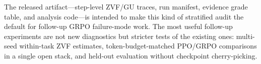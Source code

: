 The released artifact---step-level ZVF/GU traces, run manifest, evidence
grade table, and analysis code---is intended to make this kind of stratified
audit the default for follow-up GRPO failure-mode work. The most useful
follow-up experiments are not new diagnostics but stricter tests of the
existing ones: multi-seed within-task ZVF estimates, token-budget-matched
PPO/GRPO comparisons in a single open stack, and held-out evaluation
without checkpoint cherry-picking.
